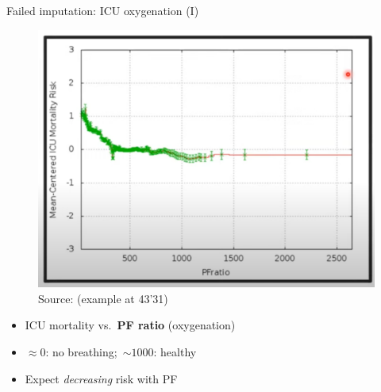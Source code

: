 \documentclass[11pt,compress,t,notes=noshow, xcolor=table]{beamer}
\begin{document}







\begin{frame}{Failed imputation: ICU oxygenation (I)}
\begin{figure}
  \centering
  \includegraphics[width=0.6\linewidth]{figure_man/Screenshot from 2025-06-03 22-38-17.png}
  \\\scriptsize Source:  (example at 43'31)
\end{figure}
\begin{itemize}
  \item ICU mortality vs.\ \textbf{PF ratio} (oxygenation)
  \item $\approx 0$: no breathing;\ $\sim1000$: healthy
  \item Expect \emph{decreasing} risk with PF
\end{itemize}
\end{frame}
\end{document}
